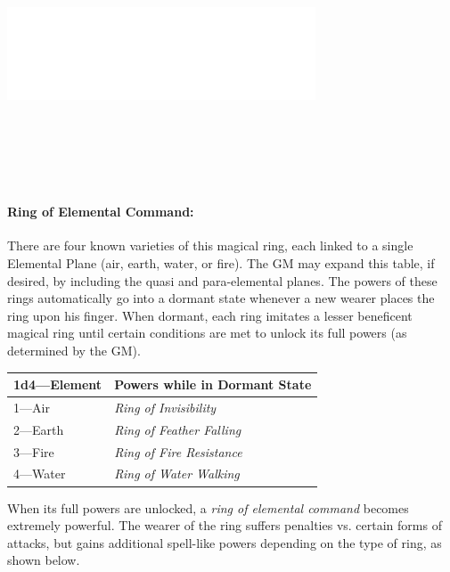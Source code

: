 \begin{multicols}{2}
\noindent\includegraphics[width=3.6in, height=3in]{testblock.pdf}

\paragraph{Ring of Elemental Command:} There are four known varieties of this magical ring, each linked to a single Elemental Plane (air, earth, water, or fire).  The GM may expand this table, if desired, by including the quasi and para-elemental planes.  The powers of these rings automatically go into a dormant state whenever a new wearer places the ring upon his finger.  When dormant, each ring imitates a lesser beneficent magical ring until certain conditions are met to unlock its full powers (as determined by the GM).  

\noindent
\begin{tabular}{|p{}|p{}|}
\hline
1d4---Element	& Powers while in Dormant State \\
\hline\hline
\rowcolor[gray]{.9}1---Air	& \textit{Ring of Invisibility} \\
2---Earth	& \textit{Ring of Feather Falling} \\
\rowcolor[gray]{.9}3---Fire	& \textit{Ring of Fire Resistance} \\
4---Water	& \textit{Ring of Water Walking} \\
\hline
\end{tabular}

When its full powers are unlocked, a \textit{ring of elemental command} becomes extremely powerful.  The wearer of the ring suffers penalties vs. certain forms of attacks, but gains additional spell-like powers depending on the type of ring, as shown below.

\end{multicols}

